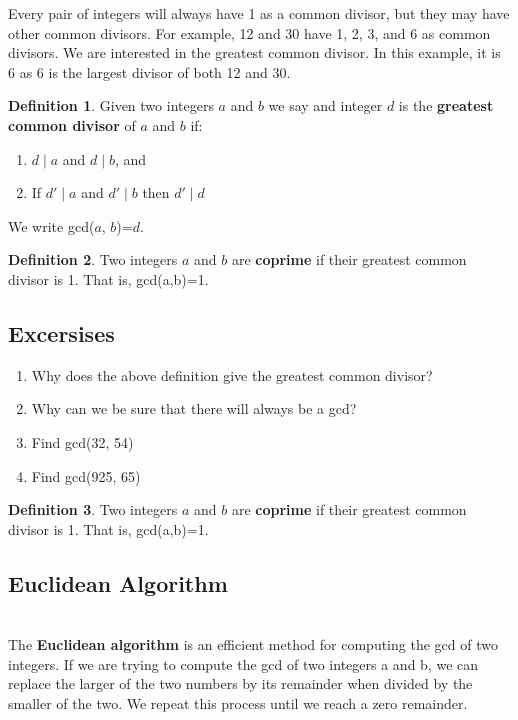 \documentclass[12pt]{amsart}
\theoremstyle{definition}
\theoremstyle{definition}
\newtheorem{definition}{Definition}
\theoremstyle{remark}
\begin{document}
Every pair of integers will always have 1 as a common divisor, but they may have other common divisors. For example, 12 and 30 have 1, 2, 3, and 6 as common divisors. We are interested in the greatest common divisor. In this example, it is 6 as 6 is the largest divisor of both 12 and 30.

\begin{definition} Given two integers $a$ and $b$ we say and integer $d$ is the \textbf{greatest common divisor} of $a$ and $b$ if:
\begin{enumerate}
\item $d\mid a$ and $d\mid b$, and 
\item If $d'\mid a$ and $d' \mid b$ then $d' \mid d$
\end{enumerate}
We write gcd($a$, $b$)=$d$.
\end{definition}

\begin{definition}
Two integers $a$ and $b$ are \textbf{coprime} if their greatest common divisor is 1. That is, gcd(a,b)=1.
\end{definition}
\subsection*{Excersises}
\begin{enumerate}
\item Why does the above definition give the greatest common divisor?
\item Why can we be sure that there will always be a gcd?
\item Find gcd(32, 54)
\item Find gcd(925, 65)
\end{enumerate}

\begin{definition}
Two integers $a$ and $b$ are \textbf{coprime} if their greatest common divisor is 1. That is, gcd(a,b)=1.
\end{definition}

\subsection*{Euclidean Algorithm}
\hfill \\

The \textbf{Euclidean algorithm} is an efficient method for computing the gcd of two integers. If we are trying to compute the gcd of two integers a and b, we can replace the larger of the two numbers by its remainder when divided by the smaller of the two. We repeat this process until we reach a zero remainder.
\end{document}
